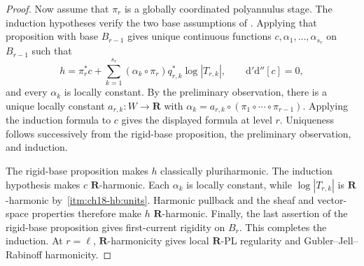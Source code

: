 \begin{proof}
Now assume that $\pi_r$ is a globally coordinated polyannulus stage.  The
induction hypotheses verify the two base assumptions of
.  Applying that proposition
with base $B_{r-1}$ gives unique continuous functions
$c,\alpha_1,\ldots,\alpha_{s_r}$ on $B_{r-1}$ such that
\[
 h=\pi_r^*c+
   \sum_{k=1}^{s_r}(\alpha_k\circ\pi_r)q_{r,k}^*\log|T_{r,k}|,
 \qquad \mathrm d'\mathrm d''[c]=0,
\]
and every $\alpha_k$ is locally constant.  By the preliminary observation,
there is a unique locally constant $a_{r,k}:W\to\mathbf R$ with
$\alpha_k=a_{r,k}\circ(\pi_1\circ\cdots\circ\pi_{r-1})$.  Applying the
induction formula to $c$ gives the displayed formula at level $r$.
Uniqueness follows successively from the rigid-base proposition, the
preliminary observation, and induction.

The rigid-base proposition makes $h$ classically pluriharmonic.  The
induction hypothesis makes $c$ $\mathbf R$-harmonic.  Each $\alpha_k$ is
locally constant, while $\log|T_{r,k}|$ is $\mathbf R$-harmonic by
\,\cref{itm:ch18-hb:units}.  Harmonic
pullback and the sheaf and vector-space properties therefore make $h$
$\mathbf R$-harmonic.  Finally, the last assertion of the rigid-base
proposition gives first-current rigidity on $B_r$.  This completes the
induction.  At $r=\ell$, $\mathbf R$-harmonicity gives local
$\mathbf R$-PL regularity and Gubler--Jell--Rabinoff harmonicity.
\end{proof}
